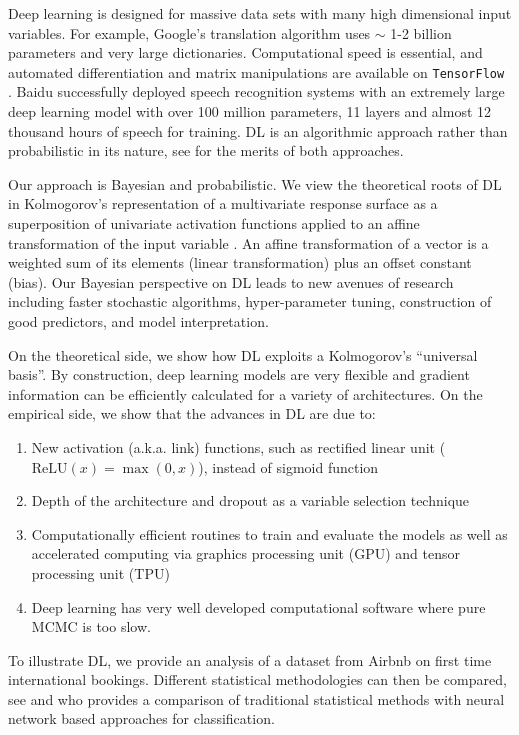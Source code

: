 \documentclass[12pt]{article}
\begin{document}
Deep learning is designed for massive data sets with many high dimensional input variables. For example, Google's translation algorithm \citep{sutskever2014sequence} uses $\sim$ 1-2 billion parameters and very large dictionaries. Computational speed is essential, and automated differentiation and matrix manipulations are available  on {\tt TensorFlow} \cite{tensorflow2015-whitepaper}. Baidu successfully deployed  speech recognition systems \citep{amodei2016deep} with  an extremely large deep learning model with over 100 million parameters, 11 layers and almost 12 thousand hours of speech for training. DL is an algorithmic approach rather than probabilistic in its nature, see \cite{breiman_statistical_2001}  for the merits of both approaches.

Our approach is Bayesian and probabilistic. We view the theoretical roots of DL in Kolmogorov's representation of a multivariate response surface as a superposition of univariate activation functions applied to an affine transformation of the input variable \citep{kolmogorov_representation_1963}. An affine transformation of a vector is a weighted sum of its elements (linear transformation) plus an offset constant (bias). Our Bayesian perspective on DL leads to  new avenues of research including faster stochastic algorithms, hyper-parameter tuning, construction of  good predictors, and model interpretation. 

On the theoretical side, we show how DL exploits a Kolmogorov's ``universal basis''. By construction, deep learning models are very flexible and gradient information can be efficiently calculated for a variety of architectures. On the empirical side, we show that the advances in DL are due to:
\begin{enumerate}[label=(\roman*)]
	\item New activation (a.k.a. link) functions, such as rectified linear unit ($\text{ReLU}(x) = \max(0,x)$), instead of sigmoid function
	\item Depth of the architecture and dropout as a variable selection technique
	\item Computationally efficient routines to train and evaluate the models as well as accelerated computing via graphics processing unit (GPU) and tensor processing unit (TPU)
	\item Deep learning has very well developed computational software where pure MCMC is too slow.
\end{enumerate}
 To illustrate DL, we provide an analysis of a dataset from Airbnb on first time international bookings. Different statistical methodologies can then be compared, see \cite{airbnb} and \cite{ripley1994neural} who provides a comparison of traditional statistical methods with neural network based approaches for classification. 
\end{document}
